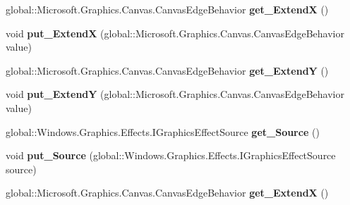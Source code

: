 \begin{DoxyCompactItemize}
global\+::\+Microsoft.\+Graphics.\+Canvas.\+Canvas\+Edge\+Behavior {\bfseries get\+\_\+\+ExtendX} ()
\item 
\mbox{\label{interface_microsoft_1_1_graphics_1_1_canvas_1_1_effects_1_1_i_border_effect_a3d2ad4061338958f9b6396932807d34e}} 
void {\bfseries put\+\_\+\+ExtendX} (global\+::\+Microsoft.\+Graphics.\+Canvas.\+Canvas\+Edge\+Behavior value)
\item 
\mbox{\label{interface_microsoft_1_1_graphics_1_1_canvas_1_1_effects_1_1_i_border_effect_a7a0f2391a20f1cfa52255948727851d6}} 
global\+::\+Microsoft.\+Graphics.\+Canvas.\+Canvas\+Edge\+Behavior {\bfseries get\+\_\+\+ExtendY} ()
\item 
\mbox{\label{interface_microsoft_1_1_graphics_1_1_canvas_1_1_effects_1_1_i_border_effect_a372972f65ae9a42601613acb61241a6d}} 
void {\bfseries put\+\_\+\+ExtendY} (global\+::\+Microsoft.\+Graphics.\+Canvas.\+Canvas\+Edge\+Behavior value)
\item 
\mbox{\label{interface_microsoft_1_1_graphics_1_1_canvas_1_1_effects_1_1_i_border_effect_a2455f124b6e073f2b70aa6c68d5bc616}} 
global\+::\+Windows.\+Graphics.\+Effects.\+I\+Graphics\+Effect\+Source {\bfseries get\+\_\+\+Source} ()
\item 
\mbox{\label{interface_microsoft_1_1_graphics_1_1_canvas_1_1_effects_1_1_i_border_effect_a7d1e465d73b86e93f93e8df97f29f492}} 
void {\bfseries put\+\_\+\+Source} (global\+::\+Windows.\+Graphics.\+Effects.\+I\+Graphics\+Effect\+Source source)
\item 
\mbox{\label{interface_microsoft_1_1_graphics_1_1_canvas_1_1_effects_1_1_i_border_effect_a3ffc4033dcf6efc380e3123b9b5c0705}} 
global\+::\+Microsoft.\+Graphics.\+Canvas.\+Canvas\+Edge\+Behavior {\bfseries get\+\_\+\+ExtendX} ()
\item 
\mbox{\label{interface_microsoft_1_1_graphics_1_1_canvas_1_1_effects_1_1_i_border_effect_a3d2ad4061338958f9b6396932807d34e}} 

\end{DoxyCompactItemize}
